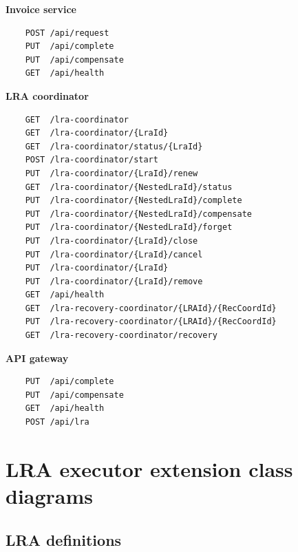 \documentclass[oneside,
  digital, %
  table,   %
  lof,     %
  lot,     %
]{fithesis3}
\begin{document}
\noindent
\textbf{Invoice service}

\begin{verbatim}
    POST /api/request
    PUT  /api/complete
    PUT  /api/compensate
    GET  /api/health
\end{verbatim}

\noindent
\textbf{LRA coordinator}

\begin{verbatim}
    GET  /lra-coordinator
    GET  /lra-coordinator/{LraId}
    GET  /lra-coordinator/status/{LraId}
    POST /lra-coordinator/start
    PUT  /lra-coordinator/{LraId}/renew
    GET  /lra-coordinator/{NestedLraId}/status
    PUT  /lra-coordinator/{NestedLraId}/complete
    PUT  /lra-coordinator/{NestedLraId}/compensate
    PUT  /lra-coordinator/{NestedLraId}/forget
    PUT  /lra-coordinator/{LraId}/close
    PUT  /lra-coordinator/{LraId}/cancel
    PUT  /lra-coordinator/{LraId}
    PUT  /lra-coordinator/{LraId}/remove
    GET  /api/health
    GET  /lra-recovery-coordinator/{LRAId}/{RecCoordId}
    PUT  /lra-recovery-coordinator/{LRAId}/{RecCoordId}
    GET  /lra-recovery-coordinator/recovery
\end{verbatim}

\noindent
\textbf{API gateway}

\begin{verbatim}
    PUT  /api/complete
    PUT  /api/compensate
    GET  /api/health
    POST /api/lra
\end{verbatim}


\clearpage
\chapter{LRA executor extension class diagrams}
\label{sec:appendix-class-diagrams}

\section{LRA definitions}

\hfill \break
\end{document}
